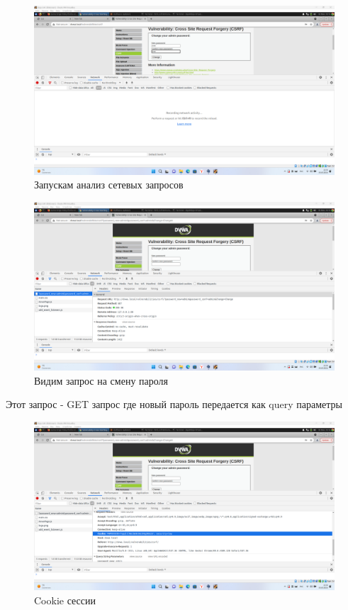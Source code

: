 \documentclass[a4paper]{article}
\begin{document}
  \begin{figure}[H]
    \centering
    \includegraphics[width=\textwidth]{Screenshot_90}
    \caption{Запускам анализ сетевых запросов}
  \end{figure}

  \begin{figure}[H]
    \centering
    \includegraphics[width=\textwidth]{Screenshot_91}
    \caption{Видим запрос на смену пароля}
  \end{figure}

  Этот запрос - GET запрос где новый пароль передается как query параметры

  \begin{figure}[H]
    \centering
    \includegraphics[width=\textwidth]{Screenshot_92}
    \caption{Cookie сессии}
  \end{figure}
\end{document}
